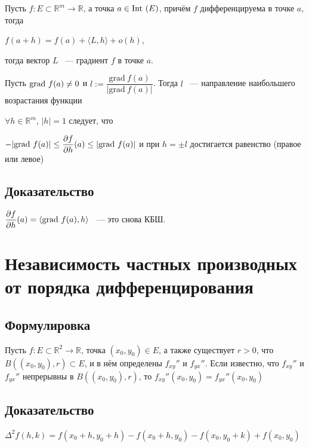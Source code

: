 \documentclass{article}
\begin{document}
            Пусть $f : E \subset \mathbb{R}^m \rightarrow \mathbb{R}$, а точка $a \in \Int (E)$, причём $f$ дифференцируема в точке $a$, тогда
            
            $f(a + h) = f(a) + \langle L, h \rangle + o(h)$,
            
            тогда вектор $L$ ~--- градиент $f$ в точке $a$.
            
            Пусть $\grad f(a) \neq 0$ и $l := \dfrac{ \mathrm{grad} \ f(a) }{ | \mathrm{grad} \ f(a) |  }$. Тогда $l$ ~--- направление наибольшего возрастания функции
            
            $\forall h \in \mathbb{R}^m$, $|h| = 1$ следует, что
            
            $-|\grad f(a)| \leq \dfrac{\partial f}{\partial h}(a) \leq |\grad f(a)|$ и при $h = \pm l$ достигается равенство (правое или левое)
            
        \subsection{Доказательство}
        
            $\dfrac{\partial f}{\partial h} (a) = \langle \grad f(a), h \rangle$ ~--- это снова КБШ.
            
    \newpage
    
    \section{Независимость частных производных от порядка дифференцирования}
    
        \subsection{Формулировка}
        
            Пусть $f : E \subset\mathbb{R}^2 \rightarrow \mathbb{R}$, точка $(x_0, y_0) \in E$, а также существует $r > 0$, что $B((x_0, y_0), r) \subset E$, и в нём определены $f_{xy}''$ и $f_{yx}''$. Если известно, что $f_{xy}''$ и $f_{yx}''$ непрерывны в $B((x_0, y_0), r)$, то $f_{xy}''(x_0, y_0) = f_{yx}''(x_0, y_0)$
            
        \subsection{Доказательство}
        
            $\Delta^2 f(h, k) = f(x_0 + h, y_0 + h) - f(x_0 + h, y_0) - f(x_0, y_0 + k) + f(x_0, y_0)$
            
\end{document}
